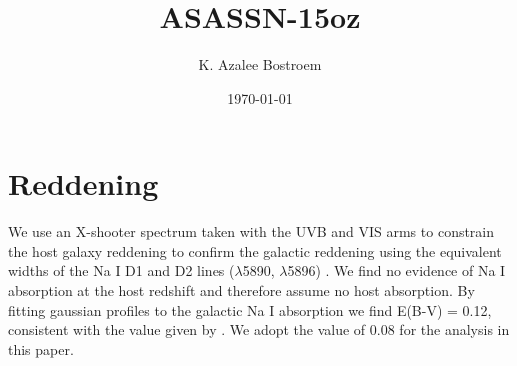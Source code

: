 \documentclass{aastex61}   	%
\begin{document}
\title{ASASSN-15oz}
\author{K. Azalee Bostroem}

\date{\today}							%

\begin{abstract}
\end{abstract}

\section{Reddening}
We use an X-shooter spectrum taken with the UVB and VIS arms to constrain the host galaxy
reddening to confirm the galactic reddening using the equivalent widths of the Na I D1 and D2 lines
($\lambda$5890, $\lambda$5896) \citep{Poznanski2012}. We find no evidence of Na I absorption at the host
redshift and therefore assume no host absorption. By fitting gaussian profiles to the galactic Na I absorption
we find E(B-V) = 0.12, consistent with the value given by \citet{Schlafly2011}. We adopt the \citet{Schlafly2011} 
value of 0.08 for the analysis in this paper. 


\facility{}



\end{document}
